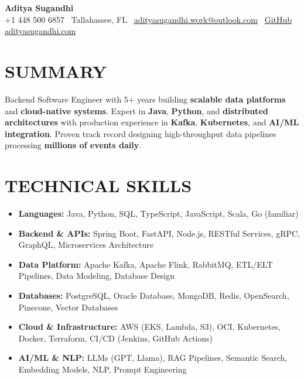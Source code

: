 \documentclass[letterpaper,10pt]{article}
\newcommand{\resumeItem}[1]{\item\small #1}
\begin{document}
\begin{center}
{\huge\textbf{Aditya Sugandhi}} \\
+1 448 500 6857 \textbar\ \textcolor{metablue}{Tallahassee, FL} \textbar\
\href{mailto:adityasugandhi.work@outlook.com}{adityasugandhi.work@outlook.com} \textbar\
\href{https://github.com/adityasugandhi}{GitHub}
\textbar \href{https://adityasugandhi.com}{adityasugandhi.com}
\end{center}
\vspace{-12pt}

\section{\textcolor{metablue}{SUMMARY}}
\small
\vspace{-6pt}
Backend Software Engineer with 5+ years building \textbf{scalable data platforms} and \textbf{cloud-native systems}. Expert in \textbf{Java}, \textbf{Python}, and \textbf{distributed architectures} with production experience in \textbf{Kafka}, \textbf{Kubernetes}, and \textbf{AI/ML integration}. Proven track record designing high-throughput data pipelines processing \textbf{millions of events daily}.

\vspace{-9pt}

\section{\textcolor{metablue}{TECHNICAL SKILLS}}
\vspace{-5pt}
\small
\begin{itemize}
\resumeItem{\textbf{Languages:} Java, Python, SQL, TypeScript, JavaScript, Scala, Go (familiar)}
\resumeItem{\textbf{Backend \& APIs:} Spring Boot, FastAPI, Node.js, RESTful Services, gRPC, GraphQL, Microservices Architecture}
\resumeItem{\textbf{Data Platform:} Apache Kafka, Apache Flink, RabbitMQ, ETL/ELT Pipelines, Data Modeling, Database Design}
\resumeItem{\textbf{Databases:} PostgreSQL, Oracle Database, MongoDB, Redis, OpenSearch, Pinecone, Vector Databases}
\resumeItem{\textbf{Cloud \& Infrastructure:} AWS (EKS, Lambda, S3), OCI, Kubernetes, Docker, Terraform, CI/CD (Jenkins, GitHub Actions)}
\resumeItem{\textbf{AI/ML \& NLP:} LLMs (GPT, Llama), RAG Pipelines, Semantic Search, Embedding Models, NLP, Prompt Engineering}
\end{itemize}
\vspace{-10pt}
\end{document}
